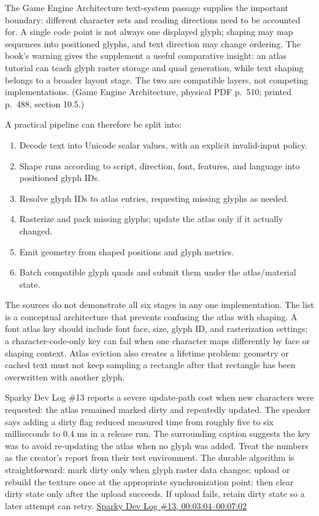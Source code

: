 The Game Engine Architecture text-system passage supplies the important boundary: different character sets and reading directions need to be accounted for. A single code point is not always one displayed glyph; shaping may map sequences into positioned glyphs, and text direction may change ordering. The book's warning gives the supplement a useful comparative insight: an atlas tutorial can teach glyph raster storage and quad generation, while text shaping belongs to a broader layout stage. The two are compatible layers, not competing implementations. (Game Engine Architecture, physical PDF p.~510; printed p.~488, section 10.5.)

A practical pipeline can therefore be split into:

\begin{enumerate}
\def\labelenumi{\arabic{enumi}.}
\tightlist
\item
  Decode text into Unicode scalar values, with an explicit invalid-input policy.
\item
  Shape runs according to script, direction, font, features, and language into positioned glyph IDs.
\item
  Resolve glyph IDs to atlas entries, requesting missing glyphs as needed.
\item
  Rasterize and pack missing glyphs; update the atlas only if it actually changed.
\item
  Emit geometry from shaped positions and glyph metrics.
\item
  Batch compatible glyph quads and submit them under the atlas/material state.
\end{enumerate}

The sources do not demonstrate all six stages in any one implementation. The list is a conceptual architecture that prevents confusing the atlas with shaping. A font atlas key should include font face, size, glyph ID, and rasterization settings; a character-code-only key can fail when one character maps differently by face or shaping context. Atlas eviction also creates a lifetime problem: geometry or cached text must not keep sampling a rectangle after that rectangle has been overwritten with another glyph.

Sparky Dev Log \#13 reports a severe update-path cost when new characters were requested: the atlas remained marked dirty and repeatedly updated. The speaker says adding a dirty flag reduced measured time from roughly five to six milliseconds to 0.4 ms in a release run. The surrounding caption suggests the key was to avoid re-updating the atlas when no glyph was added. Treat the numbers as the creator's report from their test environment. The durable algorithm is straightforward: mark dirty only when glyph raster data changes; upload or rebuild the texture once at the appropriate synchronization point; then clear dirty state only after the upload succeeds. If upload fails, retain dirty state so a later attempt can retry. \href{https://www.youtube.com/watch?v=njTgcayfhJU&t=3m4s}{Sparky Dev Log \#13, 00:03:04--00:07:02}

